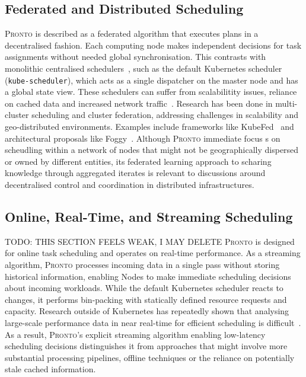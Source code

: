 \subsection{Federated and Distributed Scheduling}
\textsc{Pronto} is described as a federated algorithm that executes plans in a
decentralised fashion. Each computing node makes independent decisions for task
assignments without needed global synchronisation. This contrasts with
monolithic centralised schedulers~\cite{kube-scheduler, gog_firmament_2016},
such as the default Kubernetes scheduler (\texttt{kube-scheduler}), which acts
as a single dispatcher on the master node and has a global state view. These
schedulers can suffer from scalabilitity issues, reliance on cached data and
increased network traffic~\cite{grammenos_pronto_2021}. Research has been done
in multi-cluster scheduling and cluster federation, addressing challenges in
scalability and geo-distributed environments. Examples include frameworks like
KubeFed~\cite{faticanti2021application} and architectural proposals like
Foggy~\cite{santoro2017foggy}. Although \textsc{Pronto} immediate focus s on
scheudling within a network of nodes that might not be geographically dispersed
or owned by different entities, its federated learning approach to scharing
knowledge through aggregated iterates is relevant to discussions around
decentralised control and coordination in distributed infrastructures.

\subsection{Online, Real-Time, and Streaming Scheduling}
TODO: THIS SECTION FEELS WEAK, I MAY DELETE
\textsc{Pronto} is designed for online task scheduling and operates on real-time
performance. As a streaming algorithm, \textsc{Pronto} processes incoming data
in a single pass without storing historical information, enabling Nodes to make
immediate scheduling decisions about incoming workloads. While the default
Kubernetes scheduler reacts to changes, it performs bin-packing with statically
defined resource requests and capacity. Research outside of Kubernetes has
repeatedly shown that analysing large-scale performance data in near real-time
for efficient scheduling is difficult~\cite{grammenos_pronto_2021}. As a result,
\textsc{Pronto}'s explicit streaming algorithm enabling low-latency scheduling
decisions distinguishes it from approaches that might involve more substantial
processing pipelines, offline techniques or the reliance on potentially stale
cached information.

